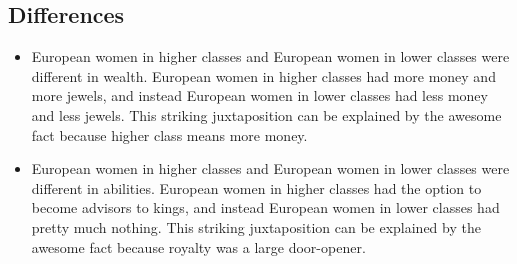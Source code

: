 \documentclass[letterpaper, 10pt]{article}
\begin{document}
            \subsection{Differences}
                \begin{itemize}
                    \item European women in higher classes and European women in lower classes were different in wealth. European women in higher classes had more money and more jewels, and instead European women in lower classes had less money and less jewels. This striking juxtaposition can be explained by the awesome fact because higher class means more money.
                    \item European women in higher classes and European women in lower classes were different in abilities. European women in higher classes had the option to become advisors to kings, and instead European women in lower classes had pretty much nothing. This striking juxtaposition can be explained by the awesome fact because royalty was a large door-opener.
                \end{itemize}
\end{document}
